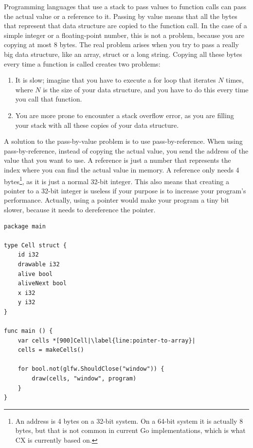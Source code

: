 \documentclass[11pt,fleqn,openany]{book} %
\begin{document}
Programming languages that use a stack to pass values to function calls can pass the actual value or a reference to it. Passing by value means that all the bytes that represent that data structure are copied to the function call. In the case of a simple integer or a floating-point number, this is not a problem, because you are copying at most 8 bytes. The real problem arises when you try to pass a really big data structure, like an array, struct or a long string. Copying all these bytes every time a function is called creates two problems:
\begin{enumerate}
    \item It is slow; imagine that you have to execute a for loop that iterates $N$ times, where $N$ is the size of your data structure, and you have to do this every time you call that function.
    \item You are more prone to encounter a stack overflow error, as you are filling your stack with all these copies of your data structure.
\end{enumerate}

A solution to the pass-by-value problem is to use pass-by-reference. When using pass-by-reference, instead of copying the actual value, you send the address of the value that you want to use. A reference is just a number that represents the index where you can find the actual value in memory. A reference only needs 4 bytes\footnote{An address is 4 bytes on a 32-bit system.  On a 64-bit system it is actually 8 bytes, but that is not common in current Go implementations, which is what CX is currently based on.}, as it is just a normal 32-bit integer. This also means that creating a pointer to a 32-bit integer is useless if your purpose is to increase your program's performance. Actually, using a pointer would make your program a tiny bit slower, because it needs to dereference the pointer.

\begin{lstlisting}[caption={Pointer to a structure instance},captionpos=b,label={listing:pointer-example-1}]
package main

type Cell struct {
	id i32
	drawable i32
	alive bool
	aliveNext bool
	x i32
	y i32
}

func main () {
	var cells *[900]Cell|\label{line:pointer-to-array}|
	cells = makeCells()
    
    for bool.not(glfw.ShouldClose("window")) {
        draw(cells, "window", program)
    }
}
\end{lstlisting}
\end{document}
